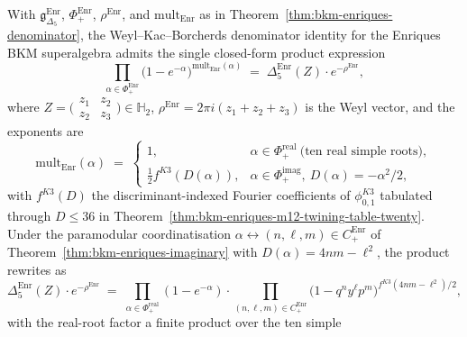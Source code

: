 \begin{theorem}
\label{thm:bkm-enriques-denominator-closed}
With $\mathfrak{g}_{\Delta_5}^{\mathrm{Enr}}$, $\Phi_+^{\mathrm{Enr}}$,
$\rho^{\mathrm{Enr}}$, and $\mathrm{mult}_{\mathrm{Enr}}$ as in
Theorem~\textup{\ref{thm:bkm-enriques-denominator}}, the
Weyl--Kac--Borcherds denominator identity for the Enriques BKM
superalgebra admits the single closed-form product expression
\begin{equation}
\label{eq:bkm-enriques-denom-closed}
 \boxed{\;
 \prod_{\alpha\in\Phi_+^{\mathrm{Enr}}}
 \bigl(1 - e^{-\alpha}\bigr)^{\mathrm{mult}_{\mathrm{Enr}}(\alpha)}
 \;=\;
 \Delta_5^{\mathrm{Enr}}(Z)\cdot e^{-\rho^{\mathrm{Enr}}},
 \;}
\end{equation}
where $Z = \bigl(\begin{smallmatrix} z_1 & z_2 \\ z_2 & z_3
\end{smallmatrix}\bigr)\in\mathbb{H}_2$, $\rho^{\mathrm{Enr}} =
2\pi i(z_1 + z_2 + z_3)$ is the Weyl vector, and the exponents are
\begin{equation}
\label{eq:bkm-enriques-denom-mult}
 \mathrm{mult}_{\mathrm{Enr}}(\alpha)
 \;=\;
 \begin{cases}
 1, & \alpha\in\Phi_+^{\mathrm{real}}\ \text{(ten real simple roots)},\\[2pt]
 \tfrac{1}{2}f^{K3}(D(\alpha)),
 & \alpha\in\Phi_+^{\mathrm{imag}},\ D(\alpha) = -\alpha^2/2,
 \end{cases}
\end{equation}
with $f^{K3}(D)$ the discriminant-indexed Fourier coefficients of
$\phi^{K3}_{0,1}$ tabulated through $D\leq 36$ in
Theorem~\textup{\ref{thm:bkm-enriques-m12-twining-table-twenty}}.
Under the paramodular coordinatisation $\alpha\leftrightarrow(n,\ell,m)
\in C_+^{\mathrm{Enr}}$ of
Theorem~\textup{\ref{thm:bkm-enriques-imaginary}} with
$D(\alpha) = 4nm-\ell^2$, the product rewrites as
\begin{equation}
\label{eq:bkm-enriques-denom-product}
 \Delta_5^{\mathrm{Enr}}(Z)\cdot e^{-\rho^{\mathrm{Enr}}}
 \;=\;
 \prod_{\alpha\in\Phi_+^{\mathrm{real}}}(1 - e^{-\alpha})
 \cdot
 \prod_{(n,\ell,m)\in C_+^{\mathrm{Enr}}}
 \bigl(1 - q^n y^\ell p^m\bigr)^{f^{K3}(4nm-\ell^2)/2},
\end{equation}
with the real-root factor a finite product over the ten simple

\end{theorem}
